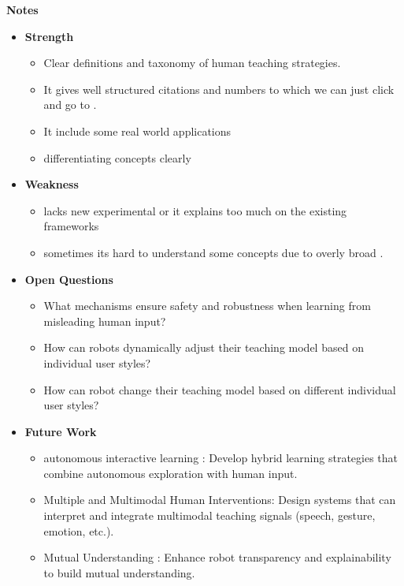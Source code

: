 \documentclass[report.tex]{subfiles}
\begin{document}
\noindent\textbf{Notes}
\begin{itemize}
    \item \noindent\textbf {Strength}
    \begin{itemize}
        \item Clear definitions and taxonomy of human teaching strategies.
        \item It gives well structured citations and numbers to which we can just click and go to .
        \item It include some real world applications
        \item differentiating concepts clearly
    \end{itemize}
    
    \item \noindent\textbf{Weakness}
    \begin{itemize}
        \item lacks new experimental or it explains too much on the existing frameworks
        \item sometimes its hard to understand some concepts due to overly broad .
       
    \end{itemize}
\end{itemize}

\begin{itemize}
    \item \noindent\textbf {Open Questions}
    \begin{itemize}
        \item What mechanisms ensure safety and robustness when learning from  misleading human input?
        \item How can robots dynamically adjust their teaching model based on individual user styles?
        \item How can robot change their teaching model based on different individual user styles?
    \end{itemize}
    
    \item \noindent\textbf{Future Work}
    \begin{itemize}
        \item  autonomous interactive learning : Develop hybrid learning strategies that combine autonomous exploration with human input.
        \item Multiple and Multimodal Human Interventions: Design systems that can interpret and integrate multimodal teaching signals (speech, gesture, emotion, etc.).
        \item Mutual Understanding : Enhance robot transparency and explainability to build mutual understanding.
    \end{itemize}
\end{itemize}
\end{document}
